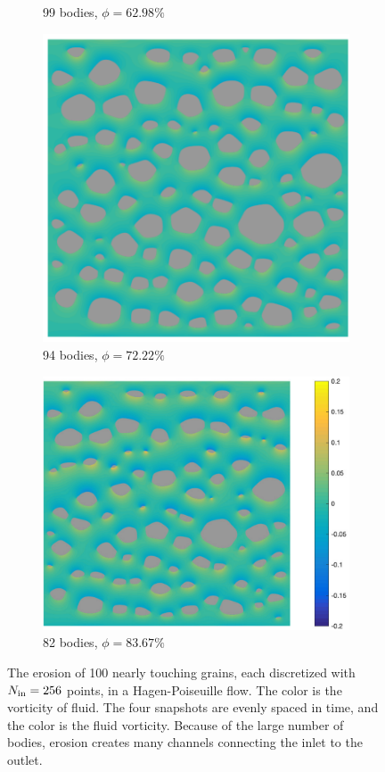 \documentclass{jfm}
\begin{document}
\begin{figure}
\begin{subfigure}[b]{0.5\textwidth}
\caption{99 bodies, $\phi = 62.98\%$}
\end{subfigure}
\begin{subfigure}[b]{0.5\textwidth}
\includegraphics*[height =0.8\linewidth]{./figs/100b_150}
\caption{94 bodies, $\phi = 72.22\%$}
\end{subfigure}%
\begin{subfigure}[b]{0.5\textwidth}
\includegraphics*[height =0.8\linewidth]{./figs/100b_200}
\caption{82 bodies, $\phi = 83.67\%$}
\end{subfigure}
\caption{\label{fig:Eroding100vort} The erosion of 100 nearly
touching grains, each discretized with $N_{\mathrm{in}} = 256$ points, in a
Hagen-Poiseuille flow. The color is the vorticity of fluid. The four
snapshots are evenly spaced in time, and the color is the fluid
vorticity.  Because of the large number of bodies, erosion creates many
channels connecting the inlet to the outlet.}
\end{figure}
\end{document}
